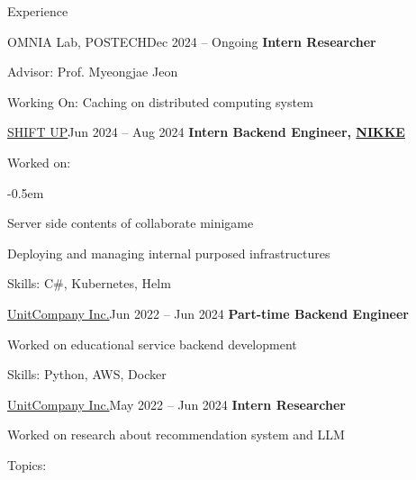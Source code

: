 \documentclass{resume}
\begin{document}
\begin{rSection}{Experience}
    \begin{rSubsection}{OMNIA Lab, POSTECH}{Dec 2024 -- Ongoing}
        \textbf{Intern Researcher}

        \item Advisor: Prof. Myeongjae Jeon

        \item Working On: Caching on distributed computing system
    \end{rSubsection}

    \begin{rSubsection}{\href{https://shiftup.co.kr/}{SHIFT UP}}{Jun 2024 -- Aug 2024}
        \textbf{Intern Backend Engineer, \href{https://nikke-en.com/}{NIKKE}}

        \item Worked on:

        \vspace{-0.5em}
        \begin{list}{--}{}
            \itemsep -0.5em

            \item Server side contents of collaborate minigame

            \item Deploying and managing internal purposed infrastructures
        \end{list}

        \item Skills: C\#, Kubernetes, Helm
    \end{rSubsection}

    \begin{rSubsection}{\href{https://unitcompany.co.kr}{UnitCompany Inc.}}{Jun 2022 -- Jun 2024}
        \textbf{Part-time Backend Engineer}

        \item Worked on educational service backend development

        \item Skills: Python, AWS, Docker
    \end{rSubsection}

    \begin{rSubsection}{\href{https://unitcompany.co.kr}{UnitCompany Inc.}}{May 2022 -- Jun 2024}
        \textbf{Intern Researcher}

        \item Worked on research about recommendation system and LLM

        \item Topics:


\end{rSubsection}
\end{rSection}
\end{document}
